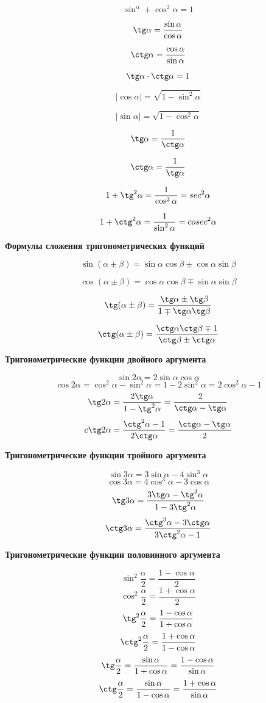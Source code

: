 \documentclass[a4paper, 12pt]{article}
\begin{document}
$$\sin^\alpha+\cos^2\alpha=1$$

$$\tg\alpha =\frac{\sin\alpha}{\cos\alpha}$$

$$\ctg\alpha =\frac{\cos\alpha}{\sin\alpha}$$

$$\tg\alpha \cdot \ctg\alpha = 1$$

$$|\cos \alpha |=\sqrt{1-\sin^2\alpha}$$

$$|\sin \alpha |=\sqrt{1-\cos^2\alpha}$$

$$\tg\alpha = \frac{1}{\ctg\alpha}$$

$$\ctg\alpha = \frac{1}{\tg\alpha}$$

$$1+\tg^2\alpha =\frac{1}{\cos^2\alpha}=sec^2\alpha$$

$$1+\ctg^2\alpha =\frac{1}{\sin^2\alpha}=cosec^2\alpha$$

\textbf{Формулы сложения тригонометрических функций}

$$\sin(\alpha \pm \beta )=\sin \alpha \cos \beta \pm \cos \alpha \sin \beta $$

$$\cos(\alpha \pm \beta )=\cos \alpha \cos\beta \mp \sin\alpha\sin\beta$$

$$\tg(\alpha\pm\beta)=\frac{\tg\alpha\pm\tg\beta}{1\mp\tg\alpha\tg\beta}$$

$$\ctg(\alpha\pm\beta)=\frac{\ctg\alpha\ctg\beta\mp1}{\ctg\beta\pm\ctg\alpha}$$

\textbf{Тригонометрические функции двойного аргумента}

$$\sin2\alpha=2\sin\alpha\cos\alpha$$
$$\cos2\alpha=\cos^2\alpha-\sin^2\alpha=1-2\sin^2\alpha=2\cos^2\alpha-1$$
$$\tg2\alpha=\frac{2\tg\alpha}{1-\tg^2\alpha}=\frac{2}{\ctg\alpha-\tg\alpha}$$
$$c\tg2\alpha=\frac{\ctg^2\alpha-1}{2\ctg\alpha}=\frac{\ctg\alpha-\tg\alpha}{2}$$

\textbf{Тригонометрические функции тройного аргумента}

$$\sin3\alpha=3\sin\alpha-4\sin^3\alpha$$
$$\cos3\alpha=4\cos^3\alpha - 3\cos\alpha$$
$$\tg3\alpha=\frac{3\tg\alpha-\tg^3\alpha}{1-3\tg^2\alpha}$$
$$\ctg3\alpha=\frac{\ctg^3\alpha-3\ctg\alpha}{3\ctg^2\alpha-1}$$

\textbf{Тригонометрические функции половинного аргумента}

$$\sin^2\frac{\alpha}{2}=\frac{1-\cos\alpha}{2}$$
$$\cos^2\frac{\alpha}{2}=\frac{1+\cos\alpha}{2}$$
$$\tg^2\frac{\alpha}{2}=\frac{1-\cos\alpha}{1+\cos\alpha}$$
$$\ctg^2\frac{\alpha}{2}=\frac{1+\cos\alpha}{1-\cos\alpha}$$
$$\tg\frac{\alpha}{2}=\frac{\sin\alpha}{1+\cos\alpha}=\frac{1-\cos\alpha}{\sin\alpha}$$
$$\ctg\frac{\alpha}{2}=\frac{\sin\alpha}{1-\cos\alpha}=\frac{1+\cos\alpha}{\sin\alpha}$$
\end{document}
